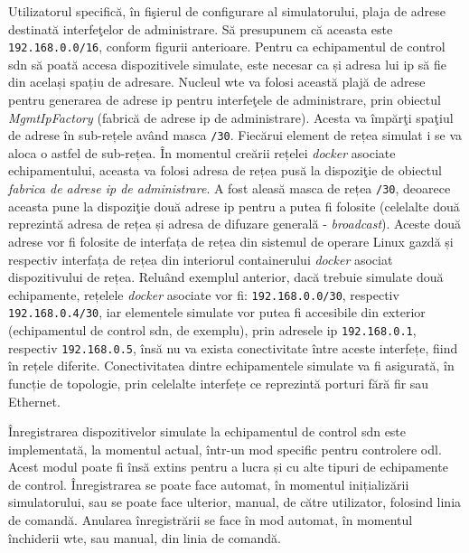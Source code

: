 Utilizatorul specifică, în fişierul de configurare al simulatorului, plaja de adrese destinată interfeţelor de administrare. Să presupunem că aceasta este \texttt{192.168.0.0/16}, conform figurii anterioare. Pentru ca echipamentul de control \gls{sdn} să poată accesa dispozitivele simulate, este necesar ca și adresa lui \gls{ip} să fie din același spațiu de adresare. Nucleul \gls{wte} va folosi această plajă de adrese pentru generarea de adrese \gls{ip} pentru interfeţele de administrare, prin obiectul \textit{MgmtIpFactory} (fabrică de adrese \gls{ip} de administrare). Acesta va împărţi spaţiul de adrese în sub-rețele având masca \texttt{/30}. Fiecărui element de rețea simulat i se va aloca o astfel de sub-rețea. În momentul creării rețelei \textit{docker} asociate echipamentului, aceasta va folosi adresa de rețea pusă la dispoziţie de obiectul \textit{fabrica de adrese \gls{ip} de administrare}. A fost aleasă masca de rețea \texttt{/30}, deoarece aceasta pune la dispoziţie două adrese \gls{ip} pentru a putea fi folosite (celelalte două reprezintă adresa de rețea și adresa de difuzare generală - \textit{broadcast}). Aceste două adrese vor fi folosite de interfața de rețea din sistemul de operare Linux gazdă și respectiv interfața de rețea din interiorul containerului \textit{docker} asociat dispozitivului de rețea. Reluând exemplul anterior, dacă trebuie simulate două echipamente, rețelele \textit{docker} asociate vor fi: \texttt{192.168.0.0/30}, respectiv \texttt{192.168.0.4/30}, iar elementele simulate vor putea fi accesibile din exterior (echipamentul de control \gls{sdn}, de exemplu), prin adresele \gls{ip} \texttt{192.168.0.1}, respectiv \texttt{192.168.0.5}, însă nu va exista conectivitate între aceste interfețe, fiind în rețele diferite. Conectivitatea dintre echipamentele simulate va fi asigurată, în funcție de topologie, prin celelalte interfețe ce reprezintă porturi fără fir sau Ethernet.

Înregistrarea dispozitivelor simulate la echipamentul de control \gls{sdn} este implementată, la momentul actual, într-un mod specific pentru controlere \gls{odl}. Acest modul poate fi însă extins pentru a lucra și cu alte tipuri de echipamente de control. Înregistrarea se poate face automat, în momentul inițializării simulatorului, sau se poate face ulterior, manual, de către utilizator, folosind linia de comandă. Anularea înregistrării se face în mod automat, în momentul închiderii \gls{wte}, sau manual, din linia de comandă.